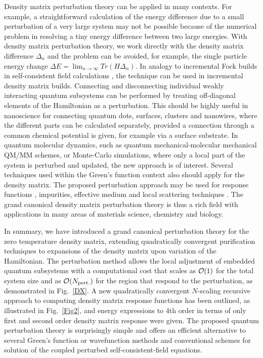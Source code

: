 \documentclass[prl,aps,twocolumn,showpacs,twocolumngrid,superbib]{revtex4}
\begin{document}
Density matrix perturbation theory can be applied in many contexts. 
For example, a straightforward calculation of the energy difference 
due to a small perturbation of a very large system may not be possible because
of the numerical problem in resolving a tiny energy difference between
two large energies. With density matrix perturbation theory, 
we work directly with the density matrix difference $\Delta_n$ and the
problem can be avoided, for example, the single particle energy change
$\Delta E = \lim_{n \rightarrow \infty} Tr(H\Delta_n)$. In analogy to incremental Fock builds
in self-consistent field calculations \cite{Schwengler97}, the technique 
can be used in incremental density matrix builds.
Connecting and disconnecting individual weakly interacting 
quantum subsystems can be performed by treating off-diagonal elements of the
Hamiltonian as a perturbation. This should be highly useful in nanoscience 
for connecting quantum dots, surfaces, clusters and nanowires, where the different 
parts can be calculated separately, provided a connection through a common
chemical potential is given, for example via a surface substrate.
In quantum molecular dynamics, such as quantum mechanical-molecular mechanical QM/MM 
schemes, or Monte-Carlo simulations, where only a local part of the system is perturbed 
and updated, the new approach is of interest. 
Several techniques used within the Green's function context also should 
apply for the density matrix. The proposed perturbation approach may 
be used for response functions \cite{Weber04}, impurities, 
effective medium and local scattering techniques \cite{Haydock80,Inglesfield81,Turek,Igor}.  
The grand canonical density matrix perturbation theory is thus a rich field
with applications in many areas of materials science, chemistry and biology.

In summary, we have introduced a grand canonical perturbation theory 
for the zero temperature density matrix, extending quadratically convergent 
purification techniques to expansions of the density matrix upon variation
of the Hamiltonian.  The perturbation method allows the local adjustment of 
embedded quantum subsystems with a computational cost that scales as ${\cal O}(1)$
for the total system size and as ${\cal O}(N_{\rm pert.})$ for the 
region that respond to the perturbation, as demonstrated in Fig.~\ref{DX}.
A new quadratically convergent $N$-scaling recursive approach to computing 
density matrix response functions has been outlined, as illustrated
in Fig.\ \ref{Fig2}, and energy 
expressions to 4th order in terms of only first and second order density matrix 
response were given.  The proposed quantum perturbation theory is surprisingly 
simple and offers an efficient alternative to several Green's function 
or wavefunction methods and conventional schemes for solution of the coupled 
perturbed self-consistent-field equations.
\end{document}
